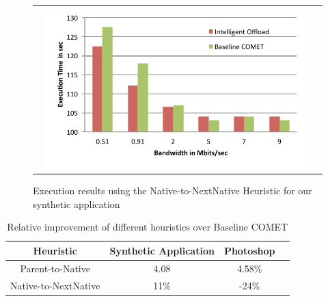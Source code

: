 \begin{figure} [thf*]
\centering
\begin{tabular}{c}
\begin{minipage}[b]{0.5\textwidth}
\includegraphics[width=0.95\textwidth]{figs/h2_sweep.pdf}
\end{minipage}
\end{tabular}
\caption{Execution results using the Native-to-NextNative Heuristic for our synthetic application}
\label{fig:h2_sweep}
\end{figure}

\begin{table}[tbh]
{\small
\centering
\begin{minipage}{0.45\textwidth}
\centering
\begin{tabular}{|c|c|c|c|}
\hline
Heuristic & Synthetic Application & Photoshop \\
\hline
\hline
Parent-to-Native & 4.08 & 4.58\% \\ \hline
\hline
Native-to-NextNative & 11\%  & -24\%  \\ \hline
 \end{tabular}
\end{minipage}
\caption{Relative improvement of different heuristics over Baseline COMET}
\label{table:heuristic}
\vspace{-6mm}
}
\end{table}




